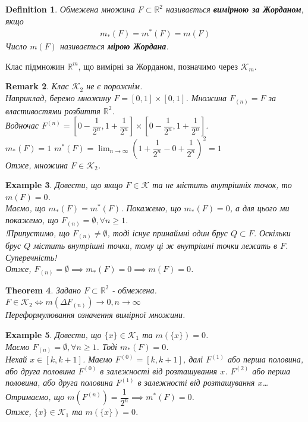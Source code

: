 \documentclass[a4paper, 10pt]{article}
\theoremstyle{theoremdd}
\newtheorem{theorem}{Theorem}[subsection]
\theoremstyle{theoremdd}
\newtheorem{definition}[theorem]{Definition}
\theoremstyle{theoremdd}
\theoremstyle{theoremdd}
\newtheorem{example}[theorem]{Example}
\theoremstyle{theoremdd}
\theoremstyle{theoremdd}
\newtheorem{remark}[theorem]{Remark}
\theoremstyle{theoremdd}
\theoremstyle{theoremdd}
\begin{document}
\begin{definition}
Обмежена множина $F \subset \mathbb{R}^2$ називається \textbf{вимірною за Жорданом}, якщо
\begin{align*}
m_*(F) = m^*(F) = m(F)
\end{align*}
Число $m(F)$ називається \textbf{мірою Жордана}.
\end{definition}
Клас підмножин $\mathbb{R}^m$, що вимірні за Жорданом, позначимо через $\mathcal{K}_m$.

\begin{remark}
Клас $\mathcal{K}_2$ не є порожнім. \\
Наприклад, беремо множину $F = [0,1] \times [0,1]$. Множина $F_{(n)} = F$ за властивостями розбиття $\mathbb{R}^2$.\\ Водночас $F^{(n)} = \left[ 0 - \dfrac{1}{2^n}, 1+\dfrac{1}{2^n} \right] \times \left[0 - \dfrac{1}{2^n}, 1+\dfrac{1}{2^n} \right]$.\\
$m_*(F) = 1$ \hspace{2cm} $m^*(F) = \displaystyle\lim_{n \to \infty} \left( 1+\dfrac{1}{2^n} - 0 + \dfrac{1}{2^n} \right)^2 = 1$\\
Отже, множина $F \in \mathcal{K}_2$.
\end{remark}

\begin{example}
Довести, що якщо $F \in \mathcal{K}$ та не містить внутрішніх точок, то $m(F) = 0$.\\
Маємо, що $m_*(F) = m^*(F)$. Покажемо, що $m_*(F) = 0$, а для цього ми покажемо, що $F_{(n)} = \emptyset, \forall n \geq 1$.\\
!Припустимо, що $F_{(n)} \neq \emptyset$, тоді існує принаймні один брус $Q \subset F$. Оскільки брус $Q$ містить внутрішні точки, тому ці ж внутрішні точки лежать в $F$. Суперечність!\\
Отже, $F_{(n)} = \emptyset \implies m_*(F) = 0 \implies m(F) = 0$.
\end{example}

\begin{theorem}
Задано $F \subset \mathbb{R}^2$ - обмежена.\\
$F \in \mathcal{K}_2 \iff m(\Delta F_{(n)}) \to 0, n \to \infty$\\
\textit{Переформулювання означення вимірної множини.}
\end{theorem}

\begin{example}
Довести, що $\{x\} \in \mathcal{K}_1$ та $m(\{x\}) = 0$.\\
Маємо $F_{(n)} = \emptyset, \forall n \geq 1$. Тоді $m_*(F) = 0$.\\
Нехай $x \in [k,k+1]$. Маємо $F^{(0)} = [k,k+1]$, далі $F^{(1)}$ або перша половина, або друга половина $F^{(0)}$ в залежності від розташування $x$. $F^{(2)}$ або перша половина, або друга половина $F^{(1)}$ в залежності від розташування $x$\dots \\
Отримаємо, що $m(F^{(n)}) = \dfrac{1}{2^n} \implies m^*(F) = 0$.\\
Отже, $\{x\} \in \mathcal{K}_1$ та $m(\{x\}) = 0$.
\end{example}
\end{document}
